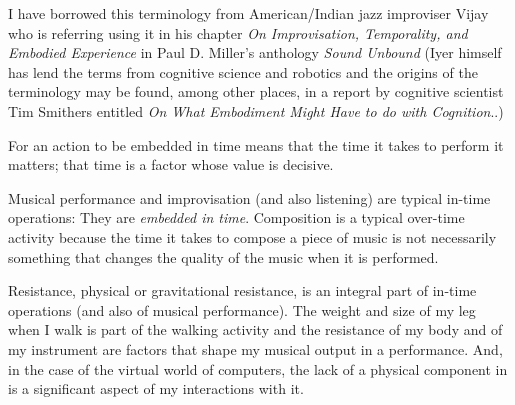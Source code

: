 \documentclass{article}
\begin{document}
I have borrowed this terminology from American/Indian jazz improviser Vijay \citet{iyer08} who is referring using it in his chapter \emph{On Improvisation, Temporality, and Embodied Experience} in Paul D. Miller's anthology \emph{Sound Unbound} (Iyer himself has lend the terms from cognitive science and robotics and the origins of the terminology may be found, among other places, in a report by cognitive scientist Tim Smithers entitled \emph{On What Embodiment Might Have to do with Cognition}.\citep{smithers96,smithers:98,vangelder98}.)



For an action to be embedded in time means that the time it takes to perform it matters; that time is a factor whose value is decisive.

Musical performance and improvisation (and also listening) are typical in-time operations: They are \emph{embedded in time}. Composition is a typical over-time activity because the time it takes to compose a piece of music is not necessarily something that changes the quality of the music when it is performed.

Resistance, physical or gravitational resistance, is an integral part of in-time operations (and also of musical performance). The weight and size of my leg when I walk is part of the walking activity and the resistance of my body and of my instrument are factors that shape my musical output in a performance. And, in the case of  the virtual world of computers, the lack of a physical component in is a significant aspect of my interactions with it.
\end{document}
